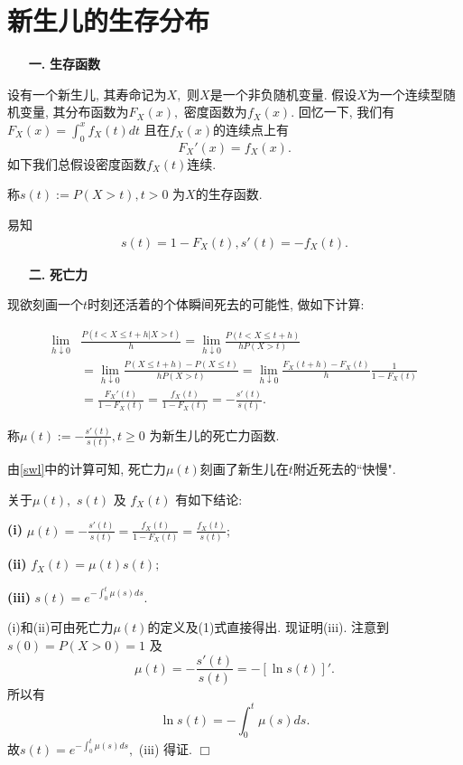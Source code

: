 \documentclass[a4paper,openany, 10pt]{ctexbook}
\newcommand{\hei}{\CJKfamily{hei}}      %
\def\qed{\hfill$\Box$\medskip}
\def\no{\nonumber}
\begin{document}
\section{新生儿的生存分布}
\begin{itemize}
    \item[{\bf\hei 一.}]{\bf\hei 生存函数}
\end{itemize}

设有一个新生儿, 其寿命记为$X,$ 则$X$是一个非负随机变量. 假设$X$为一个连续型随机变量, 其分布函数为$F_X(x),$ 密度函数为$f_X(x).$ 回忆一下, 我们有 $F_X(x)=\int_0^x f_X(t)dt$ 且在$f_X(x)$的连续点上有
$$F_X'(x)=f_X(x).$$
如下我们总假设密度函数$f_X(t)$连续.
\begin{definition}
    称$s(t):=P(X>t),t>0$ 为$X$的生存函数.
\end{definition}
易知
\begin{align}\label{sf}
    s(t)=1-F_X(t), s'(t)=-f_X(t).
\end{align}

\begin{itemize}
    \item[{\bf\hei  二.}]{\bf\hei 死亡力}
\end{itemize}

现欲刻画一个$t$时刻还活着的个体瞬间死去的可能性, 做如下计算:

\begin{align}\label{swl}
    \lim_{h\downarrow0} & \frac{P(t<X\le t+h|X>t)}{h}=\lim_{h\downarrow0} \frac{P(t<X\le t+h)}{hP(X>t)}\no                                            \\
                        & =\lim_{h\downarrow0}\frac{P(X\le t+h)-P(X\le t)}{hP(X>t)}=\lim_{h\downarrow0}\frac{F_X(t+h)-F_X(t)}{h}\frac{1}{1-F_X(t)}\no \\
                        & =\frac{F_X'(t)}{1-F_X(t)}=\frac{f_X(t)}{1-F_X(t)}=-\frac{s'(t)}{s(t)}.
\end{align}

\begin{definition}
    称$\mu(t):=-\frac{s'(t)}{s(t)},t\ge 0$ 为新生儿的死亡力函数.
\end{definition}
由\eqref{swl}中的计算可知, 死亡力$\mu(t)$刻画了新生儿在$t$附近死去的``快慢".

\begin{proposition} 关于$\mu(t),$ $s(t)$ 及 $f_X(t)$ 有如下结论:

    {\rm\bf(i)} $\mu(t)=-\frac{s'(t)}{s(t)}=\frac{f_X(t)}{1-F_X(t)}=\frac{f_X(t)}{s(t)};$

    {\rm\bf(ii)} $f_X(t)=\mu(t)s(t);$

    {\rm\bf(iii)} $s(t)=e^{-\int_0^t\mu(s)ds}.$

\end{proposition}
\proof (i)和(ii)可由死亡力$\mu(t)$的定义及(1)式直接得出. 现证明(iii). 注意到$s(0)=P(X>0)=1$ 及
$$\mu(t)=-\frac{s'(t)}{s(t)}=-[\ln s(t)]'.$$ 所以有
$$\ln s(t)=-\int_0^t\mu(s)ds.$$ 故$s(t)=e^{-\int_0^t\mu(s)ds},$ (iii) 得证. \qed
\end{document}
